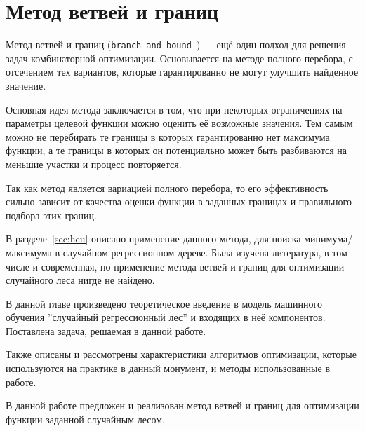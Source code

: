 \section{Метод ветвей и границ}\label{sec:branch_bound}

Метод ветвей и границ (\texttt{branch and bound}~\cite{branch}) --- ещё один
подход для решения задач комбинаторной оптимизации. Основывается на методе
полного перебора, с отсечением тех вариантов, которые гарантированно не могут
улучшить найденное значение.

Основная идея метода заключается в том, что при некоторых ограничениях на
параметры целевой функции можно оценить её возможные значения. Тем самым можно
не перебирать те границы в которых гарантированно нет максимума функции, а те
границы в которых он потенциально может быть разбиваются на меньшие участки
и процесс повторяется.

Так как метод является вариацией полного перебора, то его эффективность сильно
зависит от качества оценки функции в заданных границах и правильного подбора
этих границ.

В разделе~\ref{sec:heu} описано применение данного метода, для поиска
минимума/максимума в случайном регрессионном дереве. Была изучена литература,
в том числе и современная, но применение метода ветвей и границ для оптимизации
случайного леса нигде не найдено.

\chapterconclusion

В данной главе произведено теоретическое введение в модель машинного обучения
''случайный регрессионный лес'' и входящих в неё компонентов. Поставлена задача,
решаемая в данной работе. 

Также описаны и рассмотрены характеристики алгоритмов оптимизации, которые
используются на практике в данный монумент, и методы использованные в работе.

В данной работе предложен и реализован метод ветвей и границ для оптимизации
функции заданной случайным лесом.
